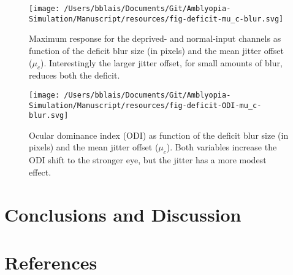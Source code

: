 \documentclass[
  onecolumn]{article}
\begin{document}
\begin{figure}
\hypertarget{fig:deficit-mu_c-blur}{%
\centering
\texttt{[image: /Users/bblais/Documents/Git/Amblyopia-Simulation/Manuscript/resources/fig-deficit-mu\_c-blur.svg]}
\caption{Maximum response for the deprived- and normal-input channels as
function of the deficit blur size (in pixels) and the mean jitter offset
(\(\mu_c\)). Interestingly the larger jitter offset, for small amounts
of blur, reduces both the deficit.}\label{fig:deficit-mu_c-blur}
}
\end{figure}

\begin{figure}
\hypertarget{fig:deficit-ODI-mu_c-blur}{%
\centering
\texttt{[image: /Users/bblais/Documents/Git/Amblyopia-Simulation/Manuscript/resources/fig-deficit-ODI-mu\_c-blur.svg]}
\caption{Ocular dominance index (ODI) as function of the deficit blur
size (in pixels) and the mean jitter offset (\(\mu_c\)). Both variables
increase the ODI shift to the stronger eye, but the jitter has a more
modest effect.}\label{fig:deficit-ODI-mu_c-blur}
}
\end{figure}

\hypertarget{conclusions-and-discussion}{%
\section{Conclusions and Discussion}\label{conclusions-and-discussion}}

\hypertarget{references}{%
\section*{References}\label{references}}
\end{document}
